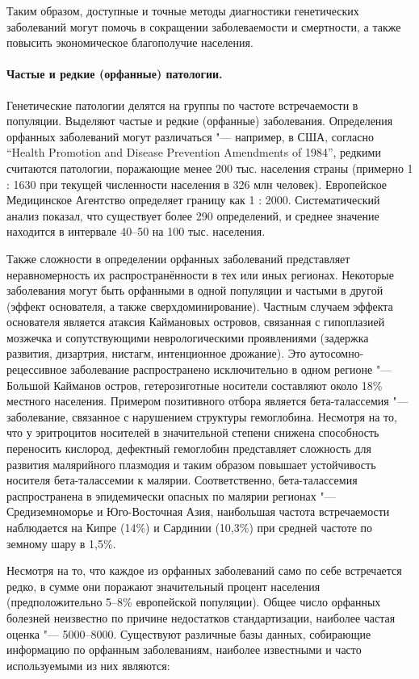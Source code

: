 \documentclass[a4paper,12pt]{article}
\begin{document}
Таким образом, доступные и точные методы диагностики генетических заболеваний могут помочь в сокращении заболеваемости и смертности, а также повысить экономическое благополучие населения.

\paragraph{Частые и редкие (орфанные) патологии.}
Генетические патологии делятся на группы по частоте встречаемости в популяции.
Выделяют частые и редкие (орфанные) заболевания.
Определения орфанных заболеваний могут различаться "--- например, в США, согласно ``Health Promotion and Disease Prevention Amendments of 1984'', редкими считаются патологии, поражающие менее 200 тыс. населения страны (примерно 1 : 1630 при текущей численности населения в 326 млн человек)\cite{Herder_2017}.
Европейское Медицинское Агентство определяет границу как 1 : 2000.
Систематический анализ показал, что существует более 290 определений, и среднее значение находится в интервале 40--50 на 100 тыс. населения\cite{Richter_2015}.

Также сложности в определении орфанных заболеваний представляет неравномерность их распространённости в тех или иных регионах.
Некоторые заболевания могут быть орфанными в одной популяции и частыми в другой (эффект основателя, а также сверхдоминирование).
Частным случаем эффекта основателя является атаксия Каймановых островов, связанная с гипоплазией мозжечка и сопутствующими неврологическими проявлениями (задержка развития, дизартрия, нистагм, интенционное дрожание).
Это аутосомно-рецессивное заболевание распространено исключительно в одном регионе "--- Большой Кайманов остров, гетерозиготные носители составляют около 18\% местного населения\cite{Bomar_2003}.
Примером позитивного отбора является бета-талассемия "--- заболевание, связанное с нарушением структуры гемоглобина.
Несмотря на то, что у эритроцитов носителей в значительной степени снижена способность переносить кислород, дефектный гемоглобин представляет сложность для развития малярийного плазмодия и таким образом повышает устойчивость носителя бета-талассемии к малярии\cite{Galanello_2010}.
Соответственно, бета-талассемия распространена в эпидемически опасных по малярии регионах "--- Средиземноморье и Юго-Восточная Азия, наибольшая частота встречаемости наблюдается на Кипре (14\%) и Сардинии (10,3\%) при средней частоте по земному шару в 1,5\%.

Несмотря на то, что каждое из орфанных заболеваний само по себе встречается редко, в сумме они поражают значительный процент населения (предположительно 5--8\% европейской популяции).
Общее число орфанных болезней неизвестно по причине недостатков стандартизации, наиболее частая оценка "--- 5000--8000\cite{The_Lancet_Neurology_2011}.
Существуют различные базы данных, собирающие информацию по орфанным заболеваниям, наиболее известными и часто используемыми из них являются:
\end{document}
